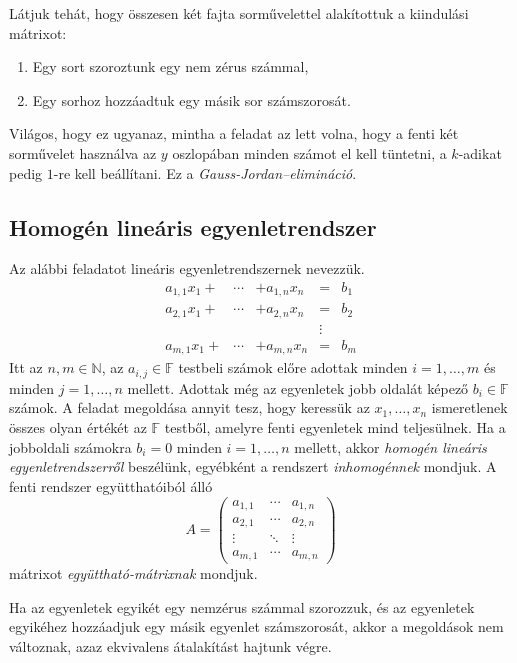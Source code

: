 \documentclass[9pt, a4paper, showtrims]{memoir}
\theoremstyle{plain}
\theoremstyle{remark}
\theoremstyle{definition}
\begin{document}
Látjuk tehát, hogy összesen két fajta sorművelettel alakítottuk a kiindulási mátrixot:
\begin{enumerate}
    \item Egy sort szoroztunk egy nem zérus számmal,
    \item Egy sorhoz hozzáadtuk egy másik sor számszorosát.
\end{enumerate}
Világos, hogy ez ugyanaz, mintha a feladat az lett volna, 
hogy a fenti két sorművelet használva az $y$ oszlopában minden számot el kell tüntetni, 
a $k$-adikat pedig $1$-re kell beállítani.
Ez a \emph{Gauss-Jordan--elimináció}.

\subsection{Homogén lineáris egyenletrendszer}
Az alábbi feladatot lineáris egyenletrendszernek nevezzük.
\[
    \begin{array}{rrlcl}
        a_{1,1}x_1+&\cdots&+a_{1,n}x_n&=& b_1\\
        a_{2,1}x_1+&\cdots&+a_{2,n}x_n&=&b_2\\
        &&&\vdots&\\
        a_{m,1}x_1+&\cdots&+a_{m,n}x_n&=& b_m
    \end{array}
\]
Itt az $n,m\in\mathbb{N}$, az $a_{i,j}\in\mathbb{F}$ testbeli számok előre adottak
minden $i=1,\dots,m$ és minden $j=1,\dots,n$ mellett.
Adottak még az egyenletek jobb oldalát képező $b_i\in\mathbb{F}$ számok.
A feladat megoldása annyit tesz, hogy keressük az $x_1,\dots,x_n$ ismeretlenek 
összes olyan értékét az $\mathbb{F}$ testből,
amelyre fenti egyenletek mind teljesülnek.
Ha a jobboldali számokra $b_i=0$ minden $i=1,\dots,n$ mellett,
akkor 
\emph{homogén lineáris egyenletrendszerről}%
beszélünk,
egyébként a rendszert
\emph{inhomogénnek}%
mondjuk.
A fenti rendszer együtthatóiból álló
\[
    A=
    \begin{pmatrix}
        a_{1,1}&\cdots&a_{1,n}\\
        a_{2,1}&\cdots&a_{2,n}\\
        \vdots&\ddots&\vdots\\
        a_{m,1}&\cdots&a_{m,n}
    \end{pmatrix}
\]
mátrixot 
\emph{együttható-mátrixnak}%
mondjuk.

Ha az egyenletek egyikét egy nemzérus számmal szorozzuk,
és az egyenletek egyikéhez hozzáadjuk egy másik egyenlet számszorosát,
akkor a megoldások nem változnak, 
azaz ekvivalens átalakítást hajtunk végre.
\end{document}

